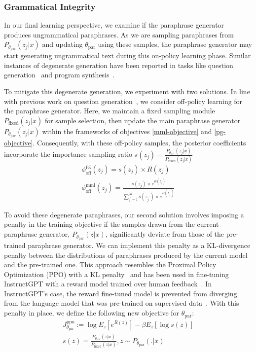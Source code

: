 \documentclass[11pt]{article}
\begin{document}
\subsubsection{Grammatical Integrity}
In our final learning perspective, we examine if the paraphrase generator produces ungrammatical paraphrases. As we are sampling paraphrases from $P_{\theta_{\text{par}}}(z_{j}|x)$ and updating $\theta_{\text{par}}$ using these samples, the paraphrase generator may start generating ungrammatical text during this on-policy learning phase. Similar instances of degenerate generation have been reported in tasks like question generation~\cite{najafi-fyshe-2023-weakly} and program synthesis~\cite{NEURIPS2018_f4e369c0}.

To mitigate this degenerate generation, we experiment with two solutions. In line with previous work on question generation~\cite{najafi-fyshe-2023-weakly}, we consider off-policy learning for the paraphrase generator. Here, we maintain a fixed sampling module $P_{\text{fixed}}(z_{j}|x)$ for sample selection, then update the main paraphrase generator $P_{\theta_{\text{par}}}(z_{j}|x)$ within the frameworks of objectives \ref{mml-objective} and \ref{pg-objective}. Consequently, with these off-policy samples, the posterior coefficients incorporate the importance sampling ratio $s(z_{j}) = \frac{P_{\theta_{\text{par}}}(z_{j}|x)}{P_{\text{fixed}}(z_{j}|x)}$
\begin{multline}
\phi^{\text{pg}}_{\text{off}}(z_{j}) = s(z_{j}) \times R(z_{j})\\
\phi^{\text{mml}}_{\text{off}}(z_{j}) = \frac{s(z_{j}) \times e^{R(z_{j})}}{\sum^{M}_{j^{'}=1} s(z_{j^{'}}) \times e^{R(z_{j^{'}})}}
\label{off-pg-mml-objective}
\end{multline}

To avoid these degenerate paraphrases, our second solution involves imposing a penalty in the training objective if the samples drawn from the current paraphrase generator, $P_{\theta_{\text{par}}}(z|x)$, significantly deviate from those of the pre-trained paraphrase generator. We can implement this penalty as a KL-divergence penalty between the distributions of paraphrases produced by the current model and the pre-trained one. This approach resembles the Proximal Policy Optimization (PPO) with a KL penalty~\cite{DBLP:journals/corr/SchulmanWDRK17} and has been used in fine-tuning InstructGPT with a reward model trained over human feedback~\cite{ouyang2022training}. In InstructGPT's case, the reward fine-tuned model is prevented from diverging from the language model that was pre-trained on supervised data~\cite{ouyang2022training}. With this penalty in place, we define the following new objective for $\theta_{\text{par}}$:
\begin{multline}
J^{\text{ppo}}_{\theta_{\text{par}}}
:= \log E_{z} [e^{R(z)}] - \beta E_{z} [\log s(z)] \\
s(z) = \frac{P_{\theta_{\text{par}}}(z|x)}{P_{\text{fixed}}
(z|x)}, z \sim P_{\theta_{\text{par}}}(.|x)
\label{lmfp-expect-ppo-objective}
\end{multline}
\end{document}
